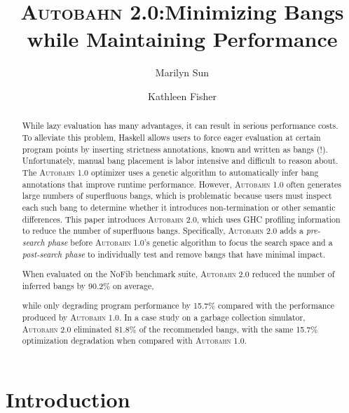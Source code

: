 \documentclass[format=sigplan, review=true, 9pt]{acmart}
\newcommand{\cut}[1]{}
\newcommand{\acut}[1]{}
\newcommand{\Ao}[0]{\textsc{Autobahn 1.0}}
\newcommand{\At}[0]{\textsc{Autobahn 2.0}}
\newcommand{\preopt}[0]{pre-search}
\newcommand{\postopt}[0]{post-search}
\begin{document}
\title{\At:\break Minimizing Bangs while Maintaining Performance}
\author{Marilyn Sun}
\author{Kathleen Fisher}
\begin{abstract}

While lazy evaluation has many advantages, it can result in serious
performance costs. To alleviate this problem, Haskell allows users to
force eager evaluation at certain program points by inserting
strictness annotations, known and written as bangs (!).
Unfortunately, manual bang placement
is labor intensive and difficult to reason about. The \Ao{}
optimizer uses a genetic algorithm to automatically infer bang annotations
that improve runtime performance. However, \Ao{} often generates
large numbers of superfluous bangs,
which is problematic because users must inspect each such bang to
determine whether it introduces non-termination or other semantic
differences. 
This paper introduces \At, which uses GHC
profiling information to reduce the number of superfluous bangs.
Specifically,
\At{} adds a \textit{\preopt{} phase} before \Ao's genetic algorithm
to focus the search space and a \textit{\postopt{} phase} to individually test
and remove bangs that have minimal impact. 
\cut{When evaluated on the NoFib
benchmark, the \preopt{} phase on average eliminated 45~locations for
potential bang placement per 100~LOC and reduced the number of bangs
eventually generated by 12.21\%. Overall, }
When evaluated on the NoFib benchmark suite, 
\At{} reduced the number of inferred bangs by 90.2\% on average,
\cut{\At{} reduces the number of
bangs generated from 11~bangs/100~LOC to 1 bang/100~LOC, }
while only degrading program performance by 15.7\% compared with the
performance produced by \Ao{}. 
In a case study on a garbage collection simulator, 
\At{} eliminated 81.8\% of the recommended bangs,  with the 
same 15.7\% optimization degradation when compared with \Ao{}.
\acut{
 Finally, it eliminated 91.3\% bangs with almost no runtime slowdown on
the \texttt{Aeson} parser library.}
\end{abstract}
\maketitle

\section{Introduction}
\end{document}
